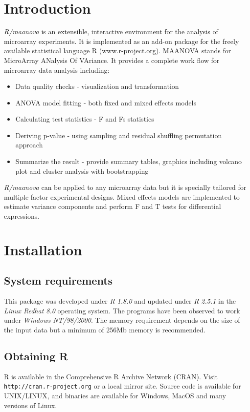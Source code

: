 \section{Introduction}
{\em R/maanova} is an extensible, 
interactive environment for the analysis of microarray experiments. 
It is implemented as an add-on
package for the freely available statistical language R (www.r-project.org).
MAANOVA stands for MicroArray ANalysis Of VAriance. It provides a complete 
work flow for microarray data analysis including:
\begin{itemize}
\item Data quality checks - visualization and transformation
\item ANOVA model fitting - both fixed and mixed effects models
\item Calculating test statistics - F and Fs statistics
\item Deriving p-value - using sampling and residual shuffling permutation approach
\item Summarize the result - provide summary tables, graphics including volcano plot and cluster analysis with bootstrapping
\end{itemize}

{\em R/maanova} can be applied to any microarray data but it is
specially tailored for multiple factor experimental designs.
Mixed effects models are implemented to estimate variance components 
and perform F and T tests for differential expressions.
\newpage
\section{Installation}
\subsection{System requirements}
This package was developed under {\em R 1.8.0} and updated under {\em R 2.5.1} in the {\em Linux Redhat 8.0} operating system. The programs have been 
observed to work under {\em Windows NT/98/2000}. The memory requirement
depends on the size of the input data but a minimum of 256Mb memory
is recommended. 
\subsection{Obtaining R}
R is available in the Comprehensive R Archive Network (CRAN).
Visit \\{\tt http://cran.r-project.org} or a local mirror site.
Source code is available for UNIX/LINUX, and binaries are 
available for Windows, MacOS and many versions of Linux.  
